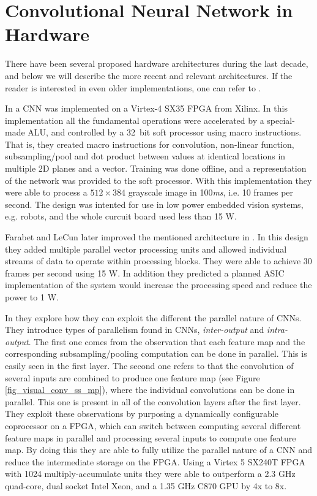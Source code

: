 \section{Convolutional Neural Network in Hardware} \label{sec_related_work_cnn}

There have been several proposed hardware architectures during the last decade, and below we will describe the more recent and relevant architectures. If the reader is interested in even older implementations, one can refer to \cite{Benkrid2002}  \cite{Cardells-Tormo2005} \cite{Hui2007} \cite{Savich2007} \cite{Girones2005}.

In \cite{Farabet2009} a CNN was implemented on a Virtex-4 SX35 FPGA from Xilinx. In this implementation all the fundamental operations were accelerated by a special-made ALU, and controlled by a 32~bit soft processor using macro instructions. That is, they created macro instructions for convolution, non-linear function, subsampling/pool and dot product between values at identical locations in multiple 2D planes and a vector. Training was done offline, and a representation of the network was provided to the soft processor. With this implementation they were able to process a $ 512 \times 384 $ grayscale image in 100\textit{ms}, i.e. 10 frames per second. The design was intented for use in low power embedded vision  systems, e.g. robots, and the whole curcuit board used less than 15 W.

Farabet and LeCun later improved the mentioned architecture in \cite{Farabet2010}. In this design they added multiple parallel vector processing units and allowed individual
streams of data to operate within processing blocks. They were able to achieve 30 frames per second using 15 W. In addition they predicted a planned ASIC implementation of the system would increase the processing speed and reduce the power to 1 W. 


In \cite{Chakradhar2010} they explore how they can exploit the different the parallel nature of CNNs. They introduce types of parallelism found in CNNs, \textit{inter-output} and \textit{intra-output}. The first one comes from the observation that each feature map and the corresponding subsampling/pooling computation can be done in parallel. This is easily seen in the first layer. The second one refers to that the convolution of several inputs are combined to produce one feature map (see Figure \ref{fig_visual_conv_ss_mp}), where the individual convolutions can be done in parallel. This one is present in all of the convolution layers after the first layer. They exploit these observations by purposing a dynamically configurable coprocessor on a FPGA, which can switch between computing several different feature maps in parallel and processing several inputs to compute one feature map. By doing this they are able to fully utilize the parallel nature of a CNN and reduce the intermediate storage on the FPGA. Using a Virtex 5 SX240T FPGA with 1024 multiply-accumulate units they were able to outperform  a 2.3 GHz quad-core, dual socket Intel Xeon, and a 1.35 GHz C870 GPU by 4x to 8x. 


